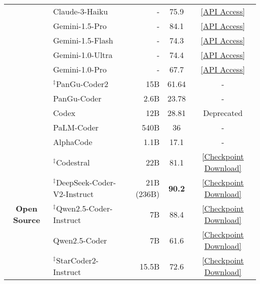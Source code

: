 \begin{table}[t!]
{{\begin{tabular}{clrcc}
         & Claude-3-Haiku \cite{claude3} & - & 75.9 & \href{https://www.anthropic.com/news/claude-3-family}{[API Access]} \\
         & Gemini-1.5-Pro \cite{reid2024gemini} & - & 84.1 & \href{https://deepmind.google/technologies/gemini/pro/}{[API Access]} \\
         & Gemini-1.5-Flash \cite{reid2024gemini} & - & 74.3 & \href{https://deepmind.google/technologies/gemini/flash/}{[API Access]} \\
         & Gemini-1.0-Ultra \cite{reid2024gemini} & - & 74.4 & \href{https://deepmind.google/technologies/gemini/ultra/}{[API Access]} \\
         & Gemini-1.0-Pro \cite{reid2024gemini} & - & 67.7 & \href{https://deepmind.google/technologies/gemini/pro/}{[API Access]} \\
         \cline{2-5}
         & $^\ddag$PanGu-Coder2 \cite{shen2023pangu} & 15B & 61.64     & - \\
         & PanGu-Coder \cite{christopoulou2022pangu} & 2.6B & 23.78        & - \\
         & Codex \cite{chen2021evaluating} & 12B & 28.81 & Deprecated \\
         & PaLM-Coder \cite{chowdhery2023palm} & 540B & 36     & - \\
         & AlphaCode \cite{li2022competition} & 1.1B & 17.1     & - \\
         \midrule
    \multirow{36}{*}{\textbf{Open Source}} 
         & $^\ddag$Codestral \cite{codestral} & 22B & 81.1 &  \href{https://huggingface.co/mistralai/Codestral-22B-v0.1}{[Checkpoint Download]} \\
         & \cellcolor{yellow!40}$^\ddag$DeepSeek-Coder-V2-Instruct \cite{zhu2024deepseek}  & \cellcolor{yellow!40}21B (236B) & \cellcolor{yellow!40}\textbf{90.2} & \href{https://huggingface.co/deepseek-ai/DeepSeek-Coder-V2-Instruct}{[Checkpoint Download]}\\
         & \cellcolor{yellow!40}$^\ddag$Qwen2.5-Coder-Instruct \cite{hui2024qwen2} & \cellcolor{yellow!40}7B & \cellcolor{yellow!40}88.4 & \href{https://huggingface.co/Qwen/Qwen2.5-Coder-7B-Instruct}{[Checkpoint Download]}\\
         & Qwen2.5-Coder \cite{hui2024qwen2} & 7B & 61.6  & \href{https://huggingface.co/Qwen/Qwen2.5-Coder-7B}{[Checkpoint Download]}\\
         & $^\ddag$StarCoder2-Instruct \cite{starcoder2instruct} &  15.5B  & 72.6 & \href{https://huggingface.co/bigcode/starcoder2-15b-instruct-v0.1}{[Checkpoint Download]} \\

\end{tabular}}}
\end{table}
